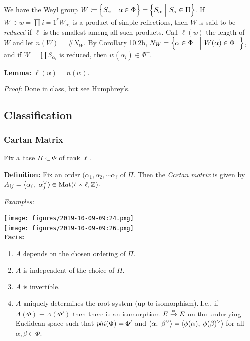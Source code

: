 We have the Weyl group
\(W \coloneqq \left\{{S_\alpha {~\mathrel{\Big|}~} \alpha \in \Phi}\right\} = \left\{{S_\alpha {~\mathrel{\Big|}~} S_\alpha \in \Pi}\right\}\).
If \(W \ni w = \prod{i=1}^\ell W_{\alpha_i}\) is a product of simple
reflections, then \(W\) is said to be \emph{reduced} if \(\ell\) is the
smallest among all such products. Call \(\ell(w)\) the length of \(W\)
and let \(n(W) = \# N_W\). By Corollary 10.2b,
\(N_W = \left\{{\alpha \in \Phi^+ {~\mathrel{\Big|}~} W(\alpha) \in \Phi^-}\right\}\), and
if \(W = \prod S_{\alpha_i}\) is reduced, then
\(w(\alpha_j) \in \Phi^-\).

\textbf{Lemma:} \(\ell(w) = n(w)\).

\emph{Proof:} Done in class, but see Humphrey's.

\hypertarget{classification}{%
\subsection{Classification}\label{classification}}

\hypertarget{cartan-matrix}{%
\subsubsection{Cartan Matrix}\label{cartan-matrix}}

Fix a base \(\Pi \subset \Phi\) of rank \(\ell\).

\textbf{Definition:} Fix an order
\((\alpha_1, \alpha_2, \cdots \alpha_\ell\) of \(\Pi\). Then the
\emph{Cartan matrix} is given by
\(A_{ij} = {\left\langle {\alpha_i},~{\alpha_j^\vee} \right\rangle} \in \mathrm{Mat}(\ell\times\ell, {\mathbb{Z}})\).

\emph{Examples:}

\texttt{[image: figures/2019-10-09-09:24.png]}\\

\texttt{[image: figures/2019-10-09-09:26.png]}\\

\textbf{Facts:}

\begin{enumerate}
\def\labelenumi{\alph{enumi}.}
\tightlist
\item
  \(A\) depends on the chosen ordering of \(\Pi\).
\item
  \(A\) is independent of the choice of \(\Pi\).
\item
  \(A\) is invertible.
\item
  \(A\) uniquely determines the root system (up to isomorphism). I.e.,
  if \(A(\Phi) = A(\Phi')\) then there is an isomorphism
  \(E \xrightarrow{\phi} E\) on the underlying Euclidean space such that
  \(\\phi(\Phi) = \Phi'\) and
  \({\left\langle {\alpha},~{\beta^\vee} \right\rangle} = {\left\langle {\phi(\alpha)},~{\phi(\beta)^\vee} \right\rangle}\)
  for all \(\alpha, \beta \in \Phi\).
\end{enumerate}

